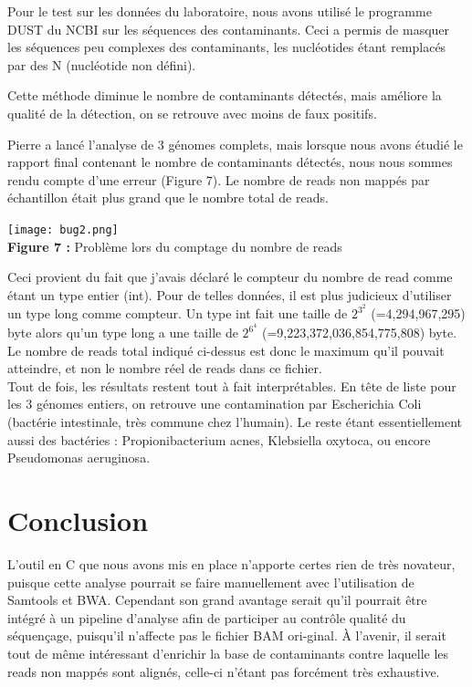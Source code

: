 \documentclass[a4paper,12pt]{article}
\begin{document}
Pour le test sur les données du laboratoire, nous avons utilisé le programme DUST du NCBI sur les séquences des contaminants. Ceci a permis de masquer les séquences peu complexes des contaminants, les nucléotides étant remplacés par des N (nucléotide non défini).

Cette méthode diminue le nombre de contaminants détectés, mais améliore la qualité de la détection, on se retrouve avec moins de faux positifs. 

Pierre a lancé l'analyse de 3 génomes complets, mais lorsque nous avons étudié le rapport final contenant le nombre de contaminants détectés, nous nous sommes rendu compte d'une erreur (Figure 7). Le nombre de reads non mappés par échantillon était plus grand que le nombre total de reads. 
\begin{center}
 \texttt{[image: bug2.png]}~\\
 \textbf{Figure 7 :} Problème lors du comptage du nombre de reads
 \end{center}
Ceci provient du fait que j'avais déclaré le compteur du nombre de read comme étant un type entier (int). Pour de telles données, il est plus judicieux d'utiliser un type long comme compteur. Un type int fait une taille de $2^3^2$ (=4,294,967,295) byte alors qu'un type long a une taille de $2^6^4$ (=9,223,372,036,854,775,808) byte. Le nombre de reads total indiqué ci-dessus est donc le maximum qu'il pouvait atteindre, et non le nombre réel de reads dans ce fichier. \\

Tout de fois, les résultats restent tout à fait interprétables. En tête de liste pour les 3 génomes entiers, on retrouve une contamination par Escherichia Coli (bactérie intestinale, très commune chez l'humain). Le reste étant essentiellement aussi des bactéries : Propionibacterium acnes, Klebsiella oxytoca, ou encore Pseudomonas aeruginosa. 

\clearpage
\section{Conclusion}
L'outil en C que nous avons mis en place n'apporte  certes rien de très novateur, puisque cette analyse pourrait se faire manuellement avec l'utilisation de Samtools et BWA. Cependant son grand avantage serait qu'il pourrait être intégré à un pipeline d'analyse afin de participer au contrôle qualité du séquençage, puisqu'il n'affecte pas le fichier BAM ori-ginal. À l'avenir, il serait tout de même intéressant d'enrichir la base de contaminants contre laquelle les reads non mappés sont alignés, celle-ci n'étant pas forcément très exhaustive.\\
\end{document}
